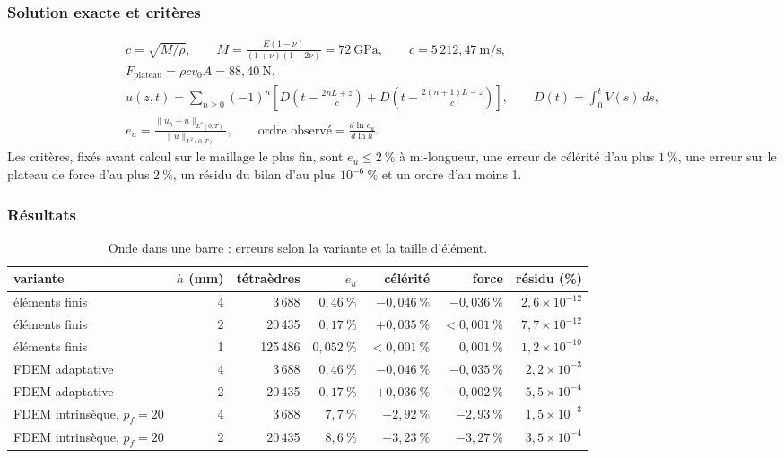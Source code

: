 \subsubsection{Solution exacte et critères}

\begin{gather}
c = \sqrt{M/\rho}, \qquad M = \frac{E(1-\nu)}{(1+\nu)(1-2\nu)} = 72~\text{GPa}, \qquad c = 5\,212{,}47~\text{m/s}, \\ F_\text{plateau} = \rho c v_0 A = 88{,}40~\text{N}, \\
u(z,t) = \sum_{n\geq0}(-1)^n\left[D\!\left(t - \frac{2nL + z}{c}\right) + D\!\left(t - \frac{2(n+1)L - z}{c}\right)\right], \qquad D(t) = \int_0^t V(s)\,ds, \\
e_u = \frac{\|u_h - u\|_{L^2(0,T)}}{\|u\|_{L^2(0,T)}}, \qquad \text{ordre observé} = \frac{d\ln e_u}{d\ln h} .
\end{gather}
Les critères, fixés avant calcul sur le maillage le plus fin, sont $e_u \leq 2~\%$ à mi-longueur, une erreur de célérité d'au plus $1~\%$, une erreur sur le plateau de force d'au plus $2~\%$, un résidu du bilan d'au plus $10^{-6}~\%$ et un ordre d'au moins 1.

\subsubsection{Résultats}

\begin{table}[htbp]
\centering
\caption{Onde dans une barre : erreurs selon la variante et la taille d'élément.}
\label{tab-V1}
\small
\begin{tabular}{@{}lrrrrrr@{}}
\toprule
variante & $h$ (mm) & tétraèdres & $e_u$ & célérité & force & résidu (\%) \\
\midrule
éléments finis & 4 & 3\,688 & $0{,}46~\%$ & $-0{,}046~\%$ & $-0{,}036~\%$ & $2{,}6\times10^{-12}$ \\
éléments finis & 2 & 20\,435 & $0{,}17~\%$ & $+0{,}035~\%$ & $<0{,}001~\%$ & $7{,}7\times10^{-12}$ \\
éléments finis & 1 & 125\,486 & $0{,}052~\%$ & $<0{,}001~\%$ & $0{,}001~\%$ & $1{,}2\times10^{-10}$ \\
FDEM adaptative & 4 & 3\,688 & $0{,}46~\%$ & $-0{,}046~\%$ & $-0{,}035~\%$ & $2{,}2\times10^{-3}$ \\
FDEM adaptative & 2 & 20\,435 & $0{,}17~\%$ & $+0{,}036~\%$ & $-0{,}002~\%$ & $5{,}5\times10^{-4}$ \\
FDEM intrinsèque, $p_f = 20$ & 4 & 3\,688 & $7{,}7~\%$ & $-2{,}92~\%$ & $-2{,}93~\%$ & $1{,}5\times10^{-3}$ \\
FDEM intrinsèque, $p_f = 20$ & 2 & 20\,435 & $8{,}6~\%$ & $-3{,}23~\%$ & $-3{,}27~\%$ & $3{,}5\times10^{-4}$ \\
\bottomrule
\end{tabular}
\end{table}


